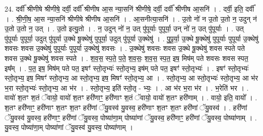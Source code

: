 \documentclass[17pt]{extarticle}
\begin{document}
24. दर्वी᳚ श्रीणीषे श्रीणीषे॒ दर्वी॒ दर्वी᳚ श्रीणीष आ॒स न्या॒सनि॑ श्रीणीषे॒ दर्वी॒ दर्वी᳚ श्रीणीष आ॒सनि॑ । . दर्वी॒ इति॒ दर्वी᳚ । . श्री॒णी॒ष॒ आ॒स न्या॒सनि॑ श्रीणीषे श्रीणीष आ॒सनि॑ । . आ॒सनीत्या॒सनि॑ । . उ॒तो नो॑ न उ॒तो उ॒तो न॒ उदुन् न॑ उ॒तो उ॒तो न॒ उत् । . उ॒तो इत्यु॒तो । . न॒ उदुन् नो॑ न॒ उत् पु॑पूर्याः पुपूर्या॒ उन् नो॑ न॒ उत् पु॑पूर्याः । . उत् पु॑पूर्याः पुपूर्या॒ उदुत् पु॑पूर्या उ॒क्थे षू॒क्थेषु॑ पुपूर्या॒ उदुत् पु॑पूर्या उ॒क्थेषु॑ । . पु॒पू॒र्या॒ उ॒क्थे षू॒क्थेषु॑ पुपूर्याः पुपूर्या उ॒क्थेषु॑ शवसः शवस उ॒क्थेषु॑ पुपूर्याः पुपूर्या उ॒क्थेषु॑ शवसः । . उ॒क्थेषु॑ शवसः शवस उ॒क्थे षू॒क्थेषु॑ शवस स्पते पते शवस उ॒क्थे षू॒क्थेषु॑ शवस स्पते । . श॒व॒स॒ स्प॒ते॒ प॒ते॒ श॒व॒सः॒ श॒व॒स॒ स्प॒त॒ इष॒ मिष॑म् पते शवसः शवस स्पत॒ इष᳚म् । . प॒त॒ इष॒ मिष॑म् पते पत॒ इषꣳ॑ स्तो॒तृभ्यः॑ स्तो॒तृभ्य॒ इष॑म् पते पत॒ इषꣳ॑ स्तो॒तृभ्यः॑ । . इषꣳ॑ स्तो॒तृभ्यः॑ स्तो॒तृभ्य॒ इष॒ मिषꣳ॑ स्तो॒तृभ्य॒ आ स्तो॒तृभ्य॒ इष॒ मिषꣳ॑ स्तो॒तृभ्य॒ आ । . स्तो॒तृभ्य॒ आ स्तो॒तृभ्यः॑ स्तो॒तृभ्य॒ आ भ॑र भ॒रा स्तो॒तृभ्यः॑ स्तो॒तृभ्य॒ आ भ॑र । . स्तो॒तृभ्य॒ इति॑ स्तो॒तृ - भ्यः॒ । . आ भ॑र भ॒रा भ॑र । . भ॒रेति॑ भर । . वायो॑ श॒तꣳ श॒तं ॅवायो॒ वायो॑ श॒तꣳ हरी॑णाꣳ॒॒ हरी॑णाꣳ श॒तं ॅवायो॒ वायो॑ श॒तꣳ हरी॑णाम् । . वायो॒ इति॒ वायो᳚ । . श॒तꣳ हरी॑णाꣳ॒॒ हरी॑णाꣳ श॒तꣳ श॒तꣳ हरी॑णां ॅयु॒वस्व॑ यु॒वस्व॒ हरी॑णाꣳ श॒तꣳ श॒तꣳ हरी॑णां ॅयु॒वस्व॑ । . हरी॑णां ॅयु॒वस्व॑ यु॒वस्व॒ हरी॑णाꣳ॒॒ हरी॑णां ॅयु॒वस्व॒ पोष्या॑णा॒म् पोष्या॑णां ॅयु॒वस्व॒ हरी॑णाꣳ॒॒ हरी॑णां ॅयु॒वस्व॒ पोष्या॑णाम् । . यु॒वस्व॒ पोष्या॑णा॒म् पोष्या॑णां ॅयु॒वस्व॑ यु॒वस्व॒ पोष्या॑णाम् । \newline
\end{document}
